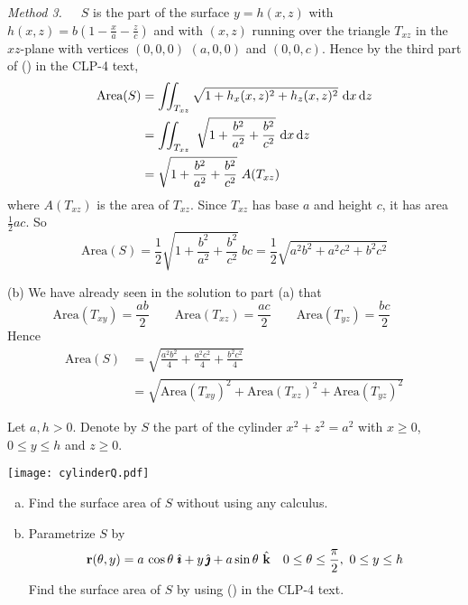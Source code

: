 \begin{solution}
\emph{Method 3.}\ \ \ 
 $S$ is the part of the surface $y=h(x,z)$ with 
$h(x,z) = b\left(1-\frac{x}{a}-\frac{z}{c}\right)$
and with $(x,z)$ running over the triangle $T_{xz}$ in the $xz$-plane 
with vertices $(0,0,0)$ $(a,0,0)$ and $(0,0,c)$.
Hence by the third part of () in the CLP-4 text,
\begin{align*}
\text{Area}(S)&=\dblInt_{T_{xz}} \sqrt{1+h_x(x,z)^2+h_z(x,z)^2}\ \dee{x}\,\dee{z} \\
&=\dblInt_{T_{xz}}\ \sqrt{1+\frac{b^2}{a^2}+\frac{b^2}{c^2}}\  
\dee{x}\,\dee{z}\\
&=\sqrt{1+\frac{b^2}{a^2}+\frac{b^2}{c^2}}\ A(T_{xz})
\end{align*}
where $A(T_{xz})$ is the area of $T_{xz}$. Since $T_{xz}$ has base $a$ and 
height $c$, it has area $\frac{1}{2}ac$. So
\begin{equation*}
\text{Area}(S)=\frac{1}{2}\sqrt{1+\frac{b^2}{a^2}+\frac{b^2}{c^2}}\ bc 
 =\frac{1}{2}\sqrt{a^2b^2+a^2c^2+b^2c^2}
\end{equation*}

(b) We have already seen in the solution to part (a) that
\begin{equation*}
\text{Area}(T_{xy})=\frac{ab}{2}\qquad
\text{Area}(T_{xz})=\frac{ac}{2}\qquad
\text{Area}(T_{yz})=\frac{bc}{2}\qquad
\end{equation*}
Hence
\begin{align*}
\text{Area}(S) 
&=\sqrt{\frac{a^2b^2}{4}+\frac{a^2c^2}{4}+\frac{b^2c^2}{4}} \\
&=\sqrt{\text{Area}(T_{xy})^2
                     +\text{Area}(T_{xz})^2
                     +\text{Area}(T_{yz})^2
                     }
\end{align*}

\end{solution}

\begin{question}
Let $a,h>0$. Denote by $S$ the part of the cylinder $x^2+z^2=a^2$ with 
$x\ge 0$, $0\le y\le h$ and $z\ge 0$.

\begin{center}
     \texttt{[image: cylinderQ.pdf]}
\end{center}

\begin{enumerate}[(a)]
\item 
Find the surface area of $S$ without using any calculus.
\item
Parametrize $S$ by 
\begin{equation*}
\vr(\theta,y) = a\,\cos\theta\ \hi +y\,\hj +a\sin\theta\ \hk\quad
0\le\theta\le\frac{\pi}{2},\ 
0\le y\le h
\end{equation*}
Find the surface area of $S$ by using ()
in the CLP-4 text.
\end{enumerate}

\end{question}

